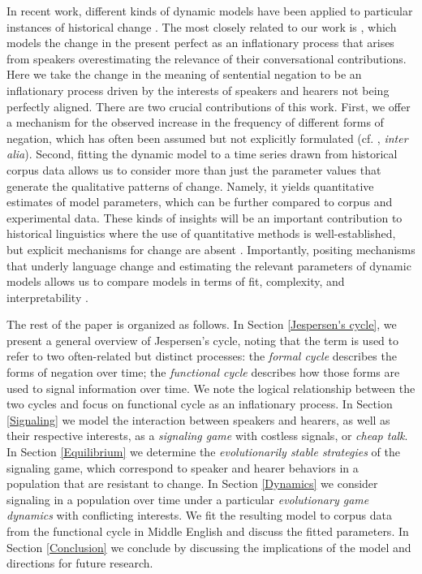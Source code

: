 \documentclass[linguex]{sp}
\theoremstyle{definition} \newtheorem{definition}{Definition}
\begin{document}
In recent work, different kinds of dynamic models have been applied to particular instances of historical change \citep{schaden2012, deo2015, yanovich2015, enke2016}. The most closely related to our work is \cite{schaden2012}, which models the change in the present perfect as an inflationary process that arises from speakers overestimating the relevance of their conversational contributions. Here we take the change in the meaning of sentential negation to be an inflationary process driven by the interests of speakers and hearers not being perfectly aligned. There are two crucial contributions of this work. First, we offer a mechanism for the observed increase in the frequency of different forms of negation, which has often been assumed but not explicitly formulated (cf. \citealt{detges-waltereit2002, hopper-traugottt2003, kiparsky-condoravdi:2006}, \emph{inter alia}).  Second, fitting the dynamic model to a time series drawn from historical corpus data allows us to consider more than just the parameter values that generate the qualitative patterns of change. Namely, it yields quantitative estimates of model parameters, which can be further compared to corpus and experimental data.  These kinds of insights will be an important contribution to historical linguistics where the use of quantitative methods is well-established, but explicit mechanisms for change are absent \citep[4]{kroch1989}. Importantly, positing mechanisms that underly language change and estimating the relevant parameters of dynamic models allows us to compare models in terms of fit, complexity, and interpretability \citep{burnham2003}. 

The rest of the paper is organized as follows. In Section \ref{Jespersen's cycle}, we present a general overview of Jespersen's cycle, noting that the term is used to refer to two often-related but distinct processes: the \emph{formal cycle} describes the forms of negation over time; the \emph{functional cycle} describes how those forms are used to signal information over time. We note the logical relationship between the two cycles and focus on functional cycle as an inflationary process. In Section \ref{Signaling} we model the interaction between speakers and hearers, as well as their respective interests, as a \emph{signaling game} with costless signals, or \emph{cheap talk}. In Section \ref{Equilibrium} we determine the \emph{evolutionarily stable strategies} of the signaling game, which correspond to speaker and hearer behaviors in a population that are resistant to change. In Section \ref{Dynamics} we consider signaling in a population over time under a particular \emph{evolutionary game dynamics} with conflicting interests. We fit the resulting model to corpus data from the functional cycle in Middle English and discuss the fitted parameters. In Section \ref{Conclusion} we conclude by discussing the implications of the model and directions for future research.
\end{document}

